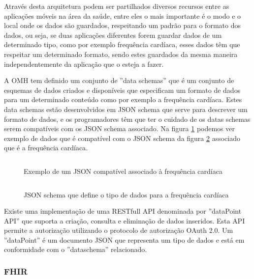 Através desta arquitetura podem ser partilhados diversos recursos entre as aplicações móveis na área da saúde, entre eles o mais importante é o modo e o local onde os dados são guardados, respeitando um padrão para o formato dos dados, ou seja, se duas aplicações diferentes forem guardar dados de um determinado tipo, como por exemplo frequência cardíaca, esses dados têm que respeitar um determinado formato, sendo estes guardados da mesma maneira independentemente da aplicação que o esteja a fazer.
\par 

A \gls{OMH} tem definido um conjunto de ''data schemas'' que é um conjunto de esquemas de dados criados e disponíveis que especificam um formato de dados para um determinado conteúdo como por exemplo a frequência cardíaca\cite{omhschemas}. Estes data schemas estão desenvolvidos em \gls{JSON} schema que serve para descrever um formato de dados, e os programadores têm que ter o cuidado de os datas schemas serem compatíveis com os \gls{JSON} schema associado. Na figura \ref{f:exemplo} podemos ver exemplo de dados que é compatível com o \gls{JSON} schema da figura \ref{f:hrjsonschema} associado que é a frequência cardíaca\cite{omhheartrate}.


\begin{figure}[H]
\inputminted[fontsize=\scriptsize]{json}{code/heart-rate.json}
\caption[Exemplo de um \gls{JSON} compatível associado à frequência cardíaca]{Exemplo de um \gls{JSON} compatível associado à frequência cardíaca \cite{omhheartrate}}
\label{f:exemplo}
\end{figure}
\newpage
\begin{figure}[!ht]
\inputminted[fontsize=\scriptsize]{json}{code/hr-jsonschema.json}
\caption[\gls{JSON} schema que define o tipo de dados para a frequência cardíaca]{\gls{JSON} schema que define o tipo de dados para a frequência cardíaca \cite{omhheartrate}}
\label{f:hrjsonschema}
\end{figure}



Existe uma implementação de uma \gls{REST}full \gls{API} denominada por ''dataPoint API'' que suporta a criação, consulta e eliminação de dados inseridos. Esta \gls{API} permite a autorização utilizando o protocolo de autorização OAuth 2.0. Um ''dataPoint'' é um documento \gls{JSON} que representa um tipo de dados e está em conformidade com o ''dataschema'' relacionado.

\subsubsection{FHIR}

